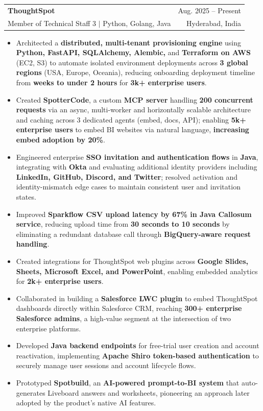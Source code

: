 \documentclass[letterpaper,11pt]{article}
\makeatletter
\newcommand{\resumeItem}[1]{%
  \item\small{#1}%
}
\newcommand{\resumeSubheading}[4]{
  \vspace{-2pt}\item
    \begin{tabular*}{0.97\textwidth}[t]{l@{\extracolsep{\fill}}r}
      \textbf{#1} & #2 \\
      {\small#3} & {\small #4} \\
    \end{tabular*}\vspace{-7pt}
}
\newcommand{\resumeItemListStart}{%
  \begin{itemize}[itemsep=0pt, parsep=0pt, topsep=0pt, partopsep=0pt]
}
\newcommand{\resumeItemListEnd}{\end{itemize}\vspace{-5pt}}
\makeatother
\begin{document}
    \resumeSubheading
      {ThoughtSpot}{Aug. 2025 -- Present}
      {Member of Technical Staff 3 $|$ {Python, Golang, Java}}{Hyderabad, India}
      \resumeItemListStart
        \resumeItem{Architected a \textbf{distributed, multi-tenant provisioning engine} using \textbf{Python, FastAPI, SQLAlchemy, Alembic,} and \textbf{Terraform on AWS} (EC2, S3) to automate isolated environment deployments across \textbf{3 global regions} (USA, Europe, Oceania), reducing onboarding deployment timeline from \textbf{weeks to under 2 hours} for \textbf{3k+ enterprise users}.}
        \resumeItem{Created \textbf{SpotterCode}, a custom \textbf{MCP server} handling \textbf{200 concurrent requests} via an async, multi-worker and horizontally scalable architecture and caching across 3 dedicated agents (embed, docs, API); enabling \textbf{5k+ enterprise users} to embed BI websites via natural language, \textbf{increasing embed adoption by 20\%}.}
        \resumeItem{Engineered enterprise \textbf{SSO invitation and authentication flows} in \textbf{Java}, integrating with \textbf{Okta} and evaluating additional identity providers including \textbf{LinkedIn, GitHub, Discord, and Twitter}; resolved activation and identity-mismatch edge cases to maintain consistent user and invitation states.}
        \resumeItem{Improved \textbf{Sparkflow CSV upload latency by 67\% in Java Callosum service}, reducing upload time from \textbf{30 seconds to 10 seconds} by eliminating a redundant database call through \textbf{BigQuery-aware request handling}.}
        \resumeItem{Created integrations for ThoughtSpot web plugins across \textbf{Google Slides, Sheets, Microsoft Excel, and PowerPoint}, enabling embedded analytics for \textbf{2k+ enterprise users}.}
        \resumeItem{Collaborated in building a \textbf{Salesforce LWC plugin} to embed ThoughtSpot dashboards directly within Salesforce CRM, reaching \textbf{300+ enterprise Salesforce admins}, a high-value segment at the intersection of two enterprise platforms.}
        \resumeItem{Developed \textbf{Java backend endpoints} for free-trial user creation and account reactivation, implementing \textbf{Apache Shiro token-based authentication} to securely manage user sessions and account lifecycle flows.}
        \resumeItem{Prototyped \textbf{Spotbuild}, an \textbf{AI-powered prompt-to-BI system} that auto-generates Liveboard answers and worksheets, pioneering an approach later adopted by the product's native AI features.}
      \resumeItemListEnd
\end{document}
